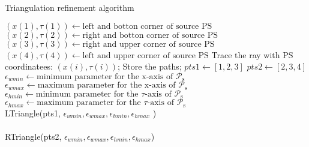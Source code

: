\begin{algorithm}
\caption{Triangulation refinement algorithm}\label{alg:triangulation}
\begin{algorithmic}[1]
\State $(x(1), \tau(1))\gets \mbox{left and  botton corner of source PS}$
\State $(x(2), \tau(2))\gets \mbox{right and  botton corner of source PS}$
\State $(x(3), \tau(3)) \gets \mbox{right and upper corner of source PS}$
\State $(x(4), \tau(4)) \gets \mbox{left and upper corner of source PS} $
\State Trace the ray with PS coordinatees: $(x(i), \tau(i))$;
\State Store the paths;
\EndFor
\State $pts1 \gets [1, 2, 3]$ 
\State $pts2 \gets [2,3, 4]$   
\State $\epsilon_{wmin} \gets \mbox{minimum parameter for the x-axis of } \mathcal{P}_\textrm{s}$
\State $\epsilon_{wmax} \gets \mbox{maximum parameter for the x-axis of } \mathcal{P}_\textrm{s}$
\State $\epsilon_{hmin}\gets  \mbox{minimum parameter for the $\tau$-axis of } \mathcal{P}_\textrm{s}$
\State $\epsilon_{hmax}\gets  \mbox{maximum parameter for the $\tau$-axis of } \mathcal{P}_\textrm{s}$ \\
LTriangle(pts1, $\epsilon_{wmin}, \epsilon_{wmax},\epsilon_{hmin}, \epsilon_{hmax}$ ) \\  \\
RTriangle(pts2, $\epsilon_{wmin}, \epsilon_{wmax},\epsilon_{hmin}, \epsilon_{hmax}$) \\ 
\EndProcedure
\end{algorithmic}
\end{algorithm}
